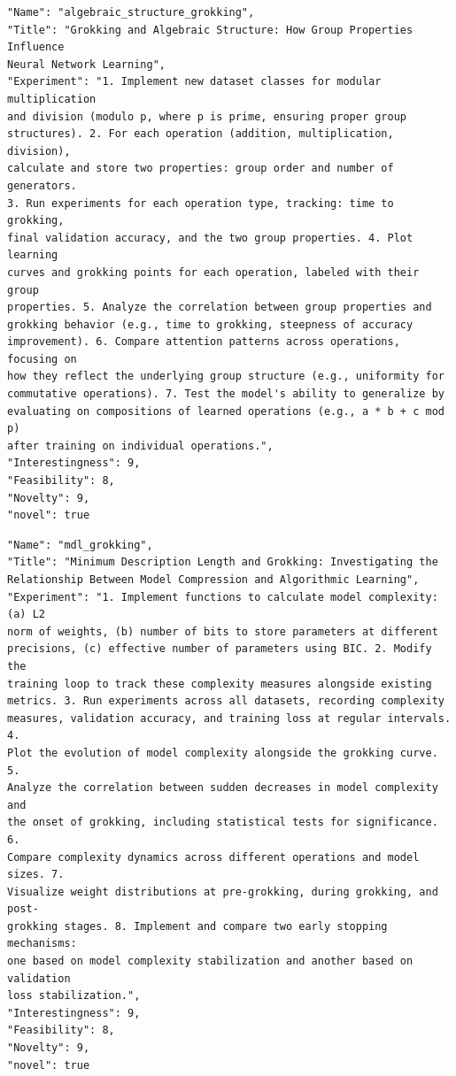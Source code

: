 \documentclass[11pt, a4paper]{include/gdm_format}
\begin{document}
\begin{tcolorbox}[breakable,colback=blue!5!white, colframe=blue!75!black, title=Idea 21/50 - \texttt{algebraic\_structure\_grokking}]
\small
\begin{verbatim}
"Name": "algebraic_structure_grokking",
"Title": "Grokking and Algebraic Structure: How Group Properties Influence
Neural Network Learning",
"Experiment": "1. Implement new dataset classes for modular multiplication
and division (modulo p, where p is prime, ensuring proper group
structures). 2. For each operation (addition, multiplication, division),
calculate and store two properties: group order and number of generators.
3. Run experiments for each operation type, tracking: time to grokking,
final validation accuracy, and the two group properties. 4. Plot learning
curves and grokking points for each operation, labeled with their group
properties. 5. Analyze the correlation between group properties and
grokking behavior (e.g., time to grokking, steepness of accuracy
improvement). 6. Compare attention patterns across operations, focusing on
how they reflect the underlying group structure (e.g., uniformity for
commutative operations). 7. Test the model's ability to generalize by
evaluating on compositions of learned operations (e.g., a * b + c mod p)
after training on individual operations.",
"Interestingness": 9,
"Feasibility": 8,
"Novelty": 9,
"novel": true
\end{verbatim}
\end{tcolorbox}

\begin{tcolorbox}[breakable,colback=blue!5!white, colframe=blue!75!black, title=Idea 22/50 - \texttt{mdl\_grokking}]
\small
\begin{verbatim}
"Name": "mdl_grokking",
"Title": "Minimum Description Length and Grokking: Investigating the
Relationship Between Model Compression and Algorithmic Learning",
"Experiment": "1. Implement functions to calculate model complexity: (a) L2
norm of weights, (b) number of bits to store parameters at different
precisions, (c) effective number of parameters using BIC. 2. Modify the
training loop to track these complexity measures alongside existing
metrics. 3. Run experiments across all datasets, recording complexity
measures, validation accuracy, and training loss at regular intervals. 4.
Plot the evolution of model complexity alongside the grokking curve. 5.
Analyze the correlation between sudden decreases in model complexity and
the onset of grokking, including statistical tests for significance. 6.
Compare complexity dynamics across different operations and model sizes. 7.
Visualize weight distributions at pre-grokking, during grokking, and post-
grokking stages. 8. Implement and compare two early stopping mechanisms:
one based on model complexity stabilization and another based on validation
loss stabilization.",
"Interestingness": 9,
"Feasibility": 8,
"Novelty": 9,
"novel": true
\end{verbatim}
\end{tcolorbox}
\end{document}

